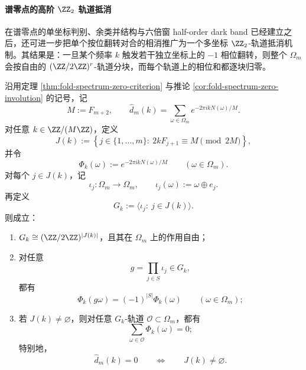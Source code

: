 \paragraph{谱零点的高阶 \texorpdfstring{$\ZZ_2$}{Z2} 轨道抵消}
在谱零点的单坐标判别、余类并结构与六倍窗 half-order dark band 已经建立之后，还可进一步把单个按位翻转对合的相消推广为一个多坐标 \(\ZZ_2\)-轨道抵消机制。其结果是：一旦某个频率 \(k\) 触发若干独立坐标上的 \(-1\) 相位翻转，则整个 \(\Omega_m\) 会按自由的 \((\ZZ/2\ZZ)^r\)-轨道分块，而每个轨道上的相位和都逐块归零。

\begin{theorem}\label{thm:xi-time-part70c-spectrum-zero-z2-orbit-cancellation}
沿用定理 \ref{thm:fold-spectrum-zero-criterion} 与推论 \ref{cor:fold-spectrum-zero-involution} 的记号，记
\[
M:=F_{m+2},
\qquad
\widehat d_m(k)=\sum_{\omega\in\Omega_m}e^{-2\pi i kN(\omega)/M}.
\]
对任意 \(k\in \ZZ/(M\ZZ)\)，定义
\[
J(k):=
\left\{
j\in\{1,\dots,m\}:\ 2kF_{j+1}\equiv M\pmod{2M}
\right\},
\]
并令
\[
\Phi_k(\omega):=e^{-2\pi i kN(\omega)/M}
\qquad
(\omega\in \Omega_m).
\]
对每个 \(j\in J(k)\)，记
\[
\iota_j:\Omega_m\to \Omega_m,
\qquad
\iota_j(\omega):=\omega\oplus e_j.
\]
再定义
\[
G_k:=\langle \iota_j:\ j\in J(k)\rangle.
\]
则成立：
\begin{enumerate}
  \item \(G_k\cong (\ZZ/2\ZZ)^{|J(k)|}\)，且其在 \(\Omega_m\) 上的作用自由；
  \item 对任意
  \[
  g=\prod_{j\in S}\iota_j\in G_k,
  \]
  都有
  \[
  \Phi_k(g\omega)=(-1)^{|S|}\Phi_k(\omega)
  \qquad
  (\omega\in\Omega_m);
  \]
  \item 若 \(J(k)\neq \varnothing\)，则对任意 \(G_k\)-轨道 \(\mathcal O\subset \Omega_m\)，都有
  \[
  \sum_{\omega\in\mathcal O}\Phi_k(\omega)=0;
  \]
  特别地，
  \[
  \widehat d_m(k)=0
  \qquad\Longleftrightarrow\qquad
  J(k)\neq \varnothing.
  \]
\end{enumerate}
\end{theorem}
